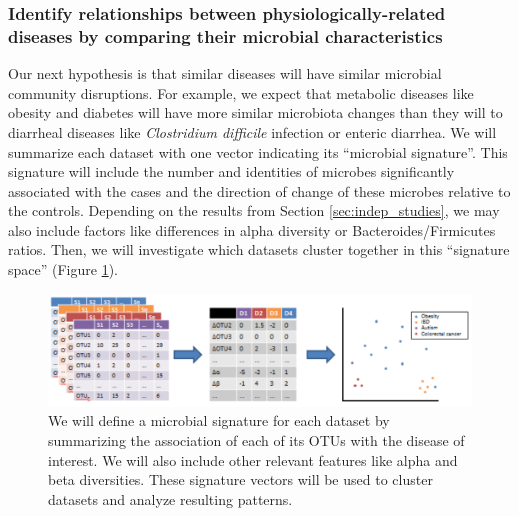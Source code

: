 \documentclass[12pt]{article}
\begin{document}
\subsubsection{Identify relationships between physiologically-related diseases by comparing their microbial characteristics}\label{sec:signatures}
Our next hypothesis is that similar diseases will have similar 
microbial community disruptions. For example, we expect that metabolic 
diseases like obesity and diabetes will have more similar microbiota 
changes than they will to diarrheal diseases like \textit{Clostridium 
difficile} infection or enteric diarrhea. We will summarize each 
dataset with one vector indicating its ``microbial signature''. This 
signature will include the number and identities of microbes 
significantly associated with the cases and the direction of change 
of these microbes relative to the controls. Depending on the results from Section 
\ref{sec:indep_studies}, we may also include factors like differences 
in alpha diversity or Bacteroides/Firmicutes ratios. Then, we will 
investigate which datasets cluster together in this ``signature space'' 
(Figure \ref{fig:microbe_signatures}).

\begin{figure}
\begin{center}
\includegraphics[scale=0.4]{microbial_signatures}
\caption{We will define a microbial signature for each dataset by summarizing
the association of each of its OTUs with the disease of interest. We will
also include other relevant features like alpha and beta diversities. These 
signature vectors will be used to cluster datasets and analyze resulting patterns.}\label{fig:microbe_signatures}
\end{center}
\end{figure}
\end{document}
